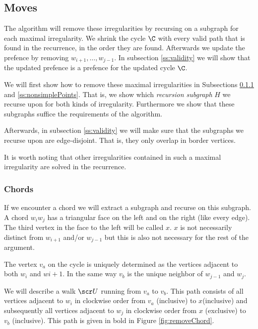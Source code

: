 \subsection{Moves}
  \newcommand{\U}{\scr U}
  The algorithm will remove these irregularities by recursing on a subgraph for each maximal irregularity. We shrink the cycle $\C$ with every valid path that is found in the recurrence, in the order they are found. Afterwards we update the prefence by removing $w_{i+1}, \ldots, w_{j-1}$. In subsection \ref{ss:validity} we will show that the updated prefence is a prefence for the updated cycle $\C$.


  We will first show how to remove these maximal irregularities in Subsections \ref{ss:chords} and \ref{ss:nonsimplePoints}. That is, we show which \emph{recursion subgraph} $H$ we recurse upon for both kinds of irregularity. Furthermore we show that these subgraphs suffice the requirements of the algorithm.

  Afterwards, in subsection \ref{ss:validity} we will make sure that the subgraphs we recurse upon are edge-disjoint. That is, they only overlap in border vertices.

  It is worth noting that other irregularities contained in such a maximal irregularity are solved in the recurrence.

  \subsubsection{Chords}
    \label{ss:chords}
    If we encounter a chord we will extract a subgraph and recurse on this subgraph. A chord $w_iw_j$ has a triangular face on the left and on the right (like every edge). The third vertex in the face to the left will be called $x$. $x$ is not necessarily distinct from $w_{i+1}$ and/or $w_{j-1}$ but this is also not necessary for the rest of the argument. 

    The vertex $v_a$ on the cycle is uniquely determined as the vertices adjacent to both $w_i$ and $w{i+1}$. In the same way $v_b$ is the unique neighbor of $w_{j-1}$ and $w_j$.

    We will describe a walk $\U$ running from $v_a$ to $v_b$. This path consists of all vertices adjacent to $w_i$ in clockwise order from $v_a$ (inclusive) to $x$(inclusive) and subsequently all vertices adjacent to $w_j$ in clockwise order from $x$ (exclusive) to $v_b$ (inclusive). This path is given in bold in Figure \ref{fig:removeChord}.

